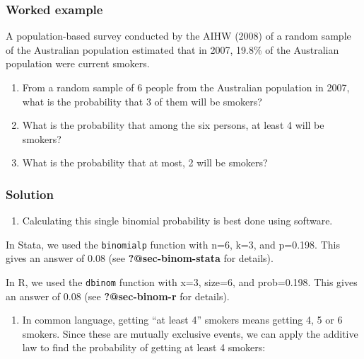 \documentclass[
  a4paper,
]{memoir}
\providecommand{\tightlist}{%
  \setlength{\itemsep}{0pt}\setlength{\parskip}{0pt}}\usepackage{longtable,booktabs,array}
\begin{document}
\hypertarget{worked-example}{%
\subsubsection*{Worked example}\label{worked-example}}

A population-based survey conducted by the AIHW (2008) of a random
sample of the Australian population estimated that in 2007, 19.8\% of
the Australian population were current smokers.

\begin{enumerate}
\def\labelenumi{\alph{enumi})}
\tightlist
\item
  From a random sample of 6 people from the Australian population in
  2007, what is the probability that 3 of them will be smokers?
\item
  What is the probability that among the six persons, at least 4 will be
  smokers?
\item
  What is the probability that at most, 2 will be smokers?
\end{enumerate}

\hypertarget{solution}{%
\subsubsection*{Solution}\label{solution}}

\begin{enumerate}
\def\labelenumi{\alph{enumi})}
\tightlist
\item
  Calculating this single binomial probability is best done using
  software.
\end{enumerate}

In Stata, we used the \texttt{binomialp} function with n=6, k=3, and
p=0.198. This gives an answer of 0.08 (see \textbf{?@sec-binom-stata}
for details).

In R, we used the \texttt{dbinom} function with x=3, size=6, and
prob=0.198. This gives an answer of 0.08 (see \textbf{?@sec-binom-r} for
details).

\begin{enumerate}
\def\labelenumi{\alph{enumi})}
\setcounter{enumi}{1}
\tightlist
\item
  In common language, getting ``at least 4'' smokers means getting 4, 5
  or 6 smokers. Since these are mutually exclusive events, we can apply
  the additive law to find the probability of getting at least 4
  smokers:
\end{enumerate}
\end{document}
